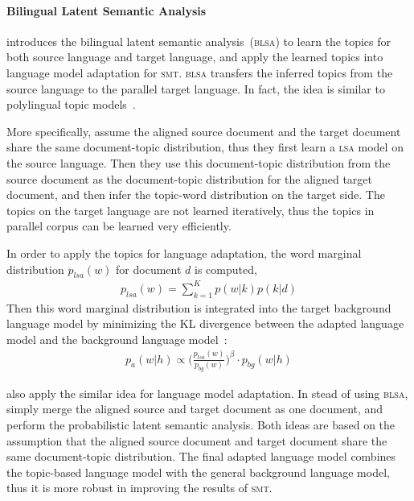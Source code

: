 \paragraph{Bilingual Latent Semantic Analysis}

\cite{Tam-2007} introduces the bilingual latent semantic
analysis~(\textsc{blsa}) to learn the topics for both source language
and target language, and apply the learned topics into language model
adaptation for \textsc{smt}. \textsc{blsa} transfers the inferred
topics from the source language to the parallel target language. In
fact, the idea is similar to polylingual topic
models~\citep{mimno-09}.

More specifically, \cite{Tam-2007} assume the aligned source document
and the target document share the same document-topic distribution,
thus they first learn a \textsc{lsa} model on the source
language. Then they use this document-topic distribution from the
source document as the document-topic distribution for the aligned
target document, and then infer the topic-word distribution on the
target side. The topics on the target language are not learned
iteratively, thus the topics in parallel corpus can be learned very
efficiently.

In order to apply the topics for language adaptation, the word
marginal distribution $p_{lsa}(w)$ for document $d$ is computed,
\begin{align}
p_{lsa}(w) = \sum_{k=1}^K p(w|k) p(k|d)
\end{align}
Then this word marginal distribution is integrated into the target background language model by minimizing the KL divergence between the adapted language model and the background language model~\citep{Kneser-1997b}:
\begin{align}
\label{eq:mdi}
p_a(w|h) \propto \Big( \frac{p_{lsa}(w)}{p_{bg}(w)} \Big) ^{\beta} \cdot p_{bg}(w|h)
\end{align}

\cite{Ruiz-2011} also apply the similar idea for language model
adaptation. In stead of using \textsc{blsa}, \cite{Ruiz-2011} simply
merge the aligned source and target document as one document, and
perform the probabilistic latent semantic analysis. Both ideas are
based on the assumption that the aligned source document and target
document share the same document-topic distribution. The final adapted
language model combines the topic-based language model with the
general background language model, thus it is more robust in improving
the results of \textsc{smt}.

